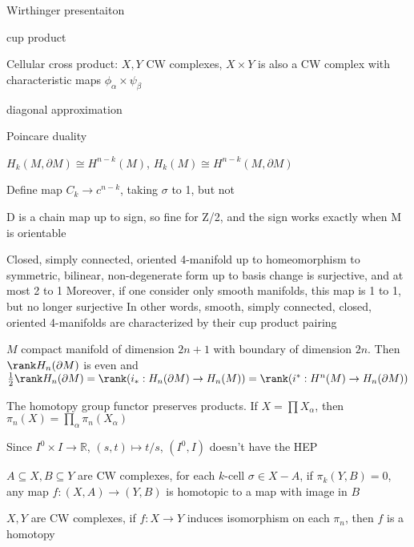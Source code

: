 \documentclass[main]{subfiles}
\begin{document}
Wirthinger presentaiton

cup product

Cellular cross product: $X,Y$ CW complexes, $X\times Y$ is also a CW complex with characteristic maps $\phi_\alpha\times\psi_\beta$

diagonal approximation

Poincare duality

$H_k(M,\partial M)\cong H^{n-k}(M)$, $H_k(M)\cong H^{n-k}(M,\partial M)$

Define map $C_k\to c^{n-k}$, taking $\sigma$ to 1, but not 

D is a chain map up to sign, so fine for Z/2, and the sign works exactly when M is orientable

\begin{theorem}
Closed, simply connected, oriented 4-manifold up to homeomorphism
to
symmetric, bilinear, non-degenerate form up to basis change
is surjective, and at most 2 to 1
Moreover, if one consider only smooth manifolds, this map is 1 to 1, but no longer surjective
In other words, smooth, simply connected, closed, oriented 4-manifolds are characterized by their cup product pairing
\end{theorem}

\begin{theorem}
$M$ compact manifold of dimension $2n+1$ with boundary of dimension $2n$. Then $\rank H_n(\partial M)$ is even and $\frac{1}{2}\rank H_n(\partial M)=\rank(i_*:H_n(\partial M)\to H_n(M))=\rank(i^*:H^n(M)\to H_n(\partial M))$
\end{theorem}

\begin{theorem}
The homotopy group functor preserves products. If $X=\prod X_\alpha$, then $\pi_n(X)=\prod_\alpha\pi_n(X_\alpha)$
\end{theorem}

\begin{example}
Since $I^0\times I\to\mathbb R$, $(s,t)\mapsto t/s$, $(I^0,I)$ doesn't have the HEP
\end{example}

\begin{lemma}
$A\subseteq X,B\subseteq Y$ are CW complexes, for each $k$-cell $\sigma\in X-A$, if $\pi_k(Y,B)=0$, any map $f:(X,A)\to(Y,B)$ is homotopic to a map with image in $B$
\end{lemma}

\begin{theorem}
$X,Y$ are CW complexes, if $f:X\to Y$ induces isomorphism on each $\pi_n$, then $f$ is a homotopy
\end{theorem}
\end{document}
